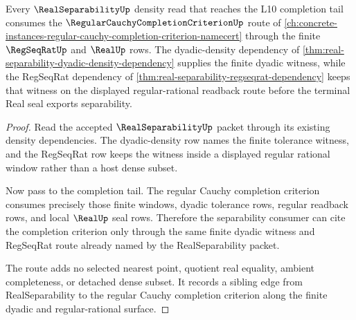 \begin{theorem}
\label{thm:regular-cauchy-completion-criterion-real-separability-route}
Every $\RealSeparabilityUp$ density read that reaches the L10 completion tail consumes the $\RegularCauchyCompletionCriterionUp$ route of \autoref{ch:concrete-instances-regular-cauchy-completion-criterion-namecert} through the finite $\RegSeqRatUp$ and $\RealUp$ rows. The dyadic-density dependency of \autoref{thm:real-separability-dyadic-density-dependency} supplies the finite dyadic witness, while the RegSeqRat dependency of \autoref{thm:real-separability-regseqrat-dependency} keeps that witness on the displayed regular-rational readback route before the terminal Real seal exports separability.
\end{theorem}
\begin{proof}
Read the accepted $\RealSeparabilityUp$ packet through its existing density dependencies. The dyadic-density row names the finite tolerance witness, and the RegSeqRat row keeps the witness inside a displayed regular rational window rather than a host dense subset.

Now pass to the completion tail. The regular Cauchy completion criterion consumes precisely those finite windows, dyadic tolerance rows, regular readback rows, and local $\RealUp$ seal rows. Therefore the separability consumer can cite the completion criterion only through the same finite dyadic witness and RegSeqRat route already named by the RealSeparability packet.

The route adds no selected nearest point, quotient real equality, ambient completeness, or detached dense subset. It records a sibling edge from RealSeparability to the regular Cauchy completion criterion along the finite dyadic and regular-rational surface.
\end{proof}
